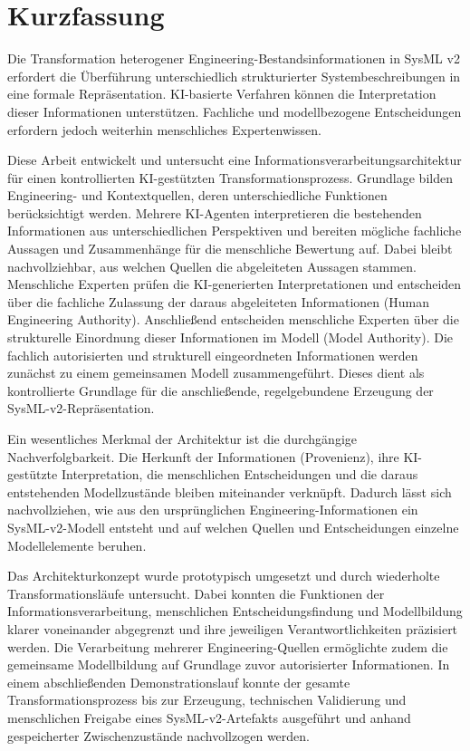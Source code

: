 \begingroup
{}

\section*{Kurzfassung}
{}

Die Transformation heterogener Engineering-Bestandsinformationen in SysML v2 erfordert die Überführung unterschiedlich strukturierter Systembeschreibungen in eine formale Repräsentation. KI-basierte Verfahren können die Interpretation dieser Informationen unterstützen. Fachliche und modellbezogene Entscheidungen erfordern jedoch weiterhin menschliches Expertenwissen.

Diese Arbeit entwickelt und untersucht eine Informationsverarbeitungsarchitektur für einen kontrollierten KI-gestützten Transformationsprozess. Grundlage bilden Engineering- und Kontextquellen, deren unterschiedliche Funktionen berücksichtigt werden. Mehrere KI-Agenten interpretieren die bestehenden Informationen aus unterschiedlichen Perspektiven und bereiten mögliche fachliche Aussagen und Zusammenhänge für die menschliche Bewertung auf. Dabei bleibt nachvollziehbar, aus welchen Quellen die abgeleiteten Aussagen stammen. Menschliche Experten prüfen die KI-generierten Interpretationen und entscheiden über die fachliche Zulassung der daraus abgeleiteten Informationen (Human Engineering Authority). Anschließend entscheiden menschliche Experten über die strukturelle Einordnung dieser Informationen im Modell (Model Authority). Die fachlich autorisierten und strukturell eingeordneten Informationen werden zunächst zu einem gemeinsamen Modell zusammengeführt. Dieses dient als kontrollierte Grundlage für die anschließende, regelgebundene Erzeugung der SysML-v2-Repräsentation.

Ein wesentliches Merkmal der Architektur ist die durchgängige Nachverfolgbarkeit. Die Herkunft der Informationen (Provenienz), ihre KI-gestützte Interpretation, die menschlichen Entscheidungen und die daraus entstehenden Modellzustände bleiben miteinander verknüpft. Dadurch lässt sich nachvollziehen, wie aus den ursprünglichen Engineering-Informationen ein SysML-v2-Modell entsteht und auf welchen Quellen und Entscheidungen einzelne Modellelemente beruhen.

Das Architekturkonzept wurde prototypisch umgesetzt und durch wiederholte Transformationsläufe untersucht. Dabei konnten die Funktionen der Informationsverarbeitung, menschlichen Entscheidungsfindung und Modellbildung klarer voneinander abgegrenzt und ihre jeweiligen Verantwortlichkeiten präzisiert werden. Die Verarbeitung mehrerer Engineering-Quellen ermöglichte zudem die gemeinsame Modellbildung auf Grundlage zuvor autorisierter Informationen. In einem abschließenden Demonstrationslauf konnte der gesamte Transformationsprozess bis zur Erzeugung, technischen Validierung und menschlichen Freigabe eines SysML-v2-Artefakts ausgeführt und anhand gespeicherter Zwischenzustände nachvollzogen werden.

